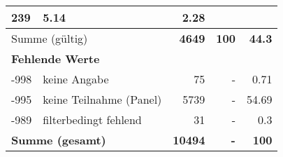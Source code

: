 \begin{longtable}{lXrrr}
       \num{239} &
       \num[round-mode=places,round-precision=2]{5.14} &
         \num[round-mode=places,round-precision=2]{2.28} \\
     \midrule
     \multicolumn{2}{l}{Summe (gültig)} &
       \textbf{\num{4649}} &
     \textbf{\num{100}} &
       \textbf{\num[round-mode=places,round-precision=2]{44.3}} \\
     \multicolumn{5}{l}{\textbf{Fehlende Werte}}\\
       -998 &
       keine Angabe &
         \num{75} &
        - &
         \num[round-mode=places,round-precision=2]{0.71} \\
       -995 &
       keine Teilnahme (Panel) &
         \num{5739} &
        - &
         \num[round-mode=places,round-precision=2]{54.69} \\
       -989 &
       filterbedingt fehlend &
         \num{31} &
        - &
         \num[round-mode=places,round-precision=2]{0.3} \\
     \midrule
     \multicolumn{2}{l}{\textbf{Summe (gesamt)}} &
          \textbf{\num{10494}} &
        \textbf{-} &
        \textbf{\num{100}} \\
     \bottomrule
     \end{longtable}
     
